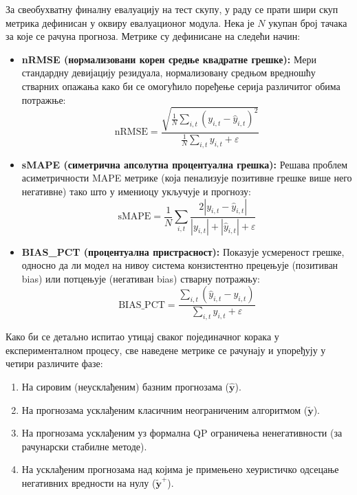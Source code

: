 \documentclass[12pt,oneside]{memoir}
\begin{document}
За свеобухватну финалну евалуацију на тест скупу, у раду се прати шири скуп метрика дефинисан у оквиру евалуационог модула. Нека је $N$ укупан број тачака за које се рачуна прогноза. Метрике су дефинисане на следећи начин:

\begin{itemize}
    \item \textbf{nRMSE (нормализовани корен средње квадратне грешке):}
    Мери стандардну девијацију резидуала, нормализовану средњом вредношћу стварних опажања како би се омогућило поређење серија различитог обима потражње:
    \begin{equation}
        \mathrm{nRMSE} = \frac{\sqrt{\frac{1}{N} \sum_{i,t} (y_{i,t} - \hat{y}_{i,t})^2}}{\frac{1}{N} \sum_{i,t} y_{i,t} + \varepsilon}
    \end{equation}


    \item \textbf{sMAPE (симетрична апсолутна процентуална грешка):}
    Решава проблем асиметричности MAPE метрике (која пенализује позитивне грешке више него негативне) тако што у имениоцу укључује и прогнозу:
    \begin{equation}
        \mathrm{sMAPE} = \frac{1}{N} \sum_{i,t} \frac{2 |y_{i,t} - \hat{y}_{i,t}|}{|y_{i,t}| + |\hat{y}_{i,t}| + \varepsilon}
    \end{equation}

    \item \textbf{BIAS\_PCT (процентуална пристрасност):}
    Показује усмереност грешке, односно да ли модел на нивоу система конзистентно прецењује (позитиван bias) или потцењује (негативан bias) стварну потражњу:
    \begin{equation}
        \mathrm{BIAS\_PCT} = \frac{\sum_{i,t} (\hat{y}_{i,t} - y_{i,t})}{\sum_{i,t} y_{i,t} + \varepsilon}
    \end{equation}
\end{itemize}

Како би се детаљно испитао утицај сваког појединачног корака у експерименталном процесу, све наведене метрике се рачунају и упоређују у четири различите фазе:
\begin{enumerate}
    \item На сировим (неусклађеним) базним прогнозама ($\hat{\mathbf{y}}$).
    \item На прогнозама усклађеним класичним неограниченим алгоритмом ($\tilde{\mathbf{y}}$).
    \item На прогнозама усклађеним уз формална QP ограничења ненегативности (за рачунарски стабилне методе).
    \item На усклађеним прогнозама над којима је примењено хеуристичко одсецање негативних вредности на нулу ($\tilde{\mathbf{y}}^{+}$).
\end{enumerate}
\end{document}
